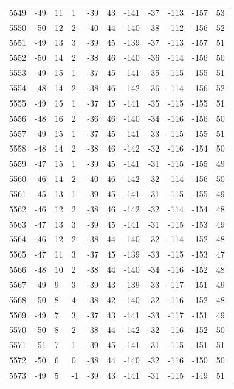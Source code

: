 \begin{table}[H]
\begin{tabular}{lllllllllll}
5549 & -49 & 11 & 1 & -39 & 43 & -141 & -37 & -113 & -157 & 53 \\
5550 & -50 & 12 & 2 & -40 & 44 & -140 & -38 & -112 & -156 & 52 \\
5551 & -49 & 13 & 3 & -39 & 45 & -139 & -37 & -113 & -157 & 51 \\
5552 & -50 & 14 & 2 & -38 & 46 & -140 & -36 & -114 & -156 & 50 \\
5553 & -49 & 15 & 1 & -37 & 45 & -141 & -35 & -115 & -155 & 51 \\
5554 & -48 & 14 & 2 & -38 & 46 & -142 & -36 & -114 & -156 & 52 \\
5555 & -49 & 15 & 1 & -37 & 45 & -141 & -35 & -115 & -155 & 51 \\
5556 & -48 & 16 & 2 & -36 & 46 & -140 & -34 & -116 & -156 & 50 \\
5557 & -49 & 15 & 1 & -37 & 45 & -141 & -33 & -115 & -155 & 51 \\
5558 & -48 & 14 & 2 & -38 & 46 & -142 & -32 & -116 & -154 & 50 \\
5559 & -47 & 15 & 1 & -39 & 45 & -141 & -31 & -115 & -155 & 49 \\
5560 & -46 & 14 & 2 & -40 & 46 & -142 & -32 & -114 & -156 & 50 \\
5561 & -45 & 13 & 1 & -39 & 45 & -141 & -31 & -115 & -155 & 49 \\
5562 & -46 & 12 & 2 & -38 & 46 & -142 & -32 & -114 & -154 & 48 \\
5563 & -47 & 13 & 3 & -39 & 45 & -141 & -31 & -115 & -153 & 49 \\
5564 & -46 & 12 & 2 & -38 & 44 & -140 & -32 & -114 & -152 & 48 \\
5565 & -47 & 11 & 3 & -37 & 45 & -139 & -33 & -115 & -153 & 47 \\
5566 & -48 & 10 & 2 & -38 & 44 & -140 & -34 & -116 & -152 & 48 \\
5567 & -49 & 9 & 3 & -39 & 43 & -139 & -33 & -117 & -151 & 49 \\
5568 & -50 & 8 & 4 & -38 & 42 & -140 & -32 & -116 & -152 & 48 \\
5569 & -49 & 7 & 3 & -37 & 43 & -141 & -33 & -117 & -151 & 49 \\
5570 & -50 & 8 & 2 & -38 & 44 & -142 & -32 & -116 & -152 & 50 \\
5571 & -51 & 7 & 1 & -39 & 45 & -141 & -31 & -115 & -151 & 51 \\
5572 & -50 & 6 & 0 & -38 & 44 & -140 & -32 & -116 & -150 & 50 \\
5573 & -49 & 5 & -1 & -39 & 43 & -141 & -31 & -115 & -149 & 51 \\

\end{tabular}
\end{table}
